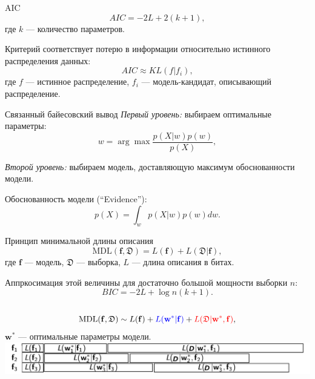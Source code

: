 \documentclass[9pt,pdf,utf8,hyperref={unicode},aspectratio=169]{beamer}
\begin{document}
\begin{frame}{AIC}
\[
	AIC = -2L + 2 (k+1),
\]
где $k$ --- количество параметров.

Критерий соответствует потерю в информации относительно истинного распределения данных:
\[
	AIC \approx KL(f|f_i), 
\]
где $f$ --- истинное распределение, $f_i$ --- модель-кандидат, описывающий распределение.
\end{frame}

\begin{frame}{Связанный байесовский вывод}
\textit{Первый уровень:} выбираем оптимальные параметры:
\[
    {w} = \arg\max \frac{p({X}|{w})p({w})}{p(X)},
\]

\textit{Второй уровень:} выбираем модель, доставляющую максимум обоснованности модели.

Обоснованность модели (``Evidence''):
\[
	p(X) = \int_w {p(X|w)}{p(w)} dw.
\]


\begin{figure}
  \centering
\label{fig:1}\qquad

\end{figure}

\end{frame}



\begin{frame}{Принцип минимальной длины описания}
\[
\text{MDL}(\mathbf{f}, \mathfrak{D}) = L(\mathbf{f}) + L(\mathfrak{D}|\mathbf{f}),
\]
где $\mathbf{f}$ --- модель, $\mathfrak{D}$ --- выборка, $L$ --- длина описания в битах.

Аппркосимация этой величины для достаточно большой мощности выборки $n$:
\[
	BIC = -2L + \log n (k+1).
\]
\\
\[
\text{MDL}(\mathbf{f}, \mathfrak{D}) \sim L(\mathbf{f}) + \textcolor{blue}{L(\mathbf{w}^*| \mathbf{f})} + \textcolor{red}{L(\mathfrak{D}|\mathbf{w}^*, \mathbf{f})},
\]
$\mathbf{w}^*$ --- оптимальные параметры модели.\\

\includegraphics[width=\textwidth]{./mdl.png}

\end{frame}
\end{document}
